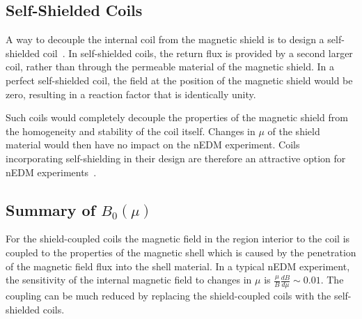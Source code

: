 \documentclass[review]{elsarticle}
\begin{document}

\subsection{Self-Shielded Coils}

A way to decouple the internal coil from the magnetic shield is to design a self-shielded
coil~\cite{bib:cpviolwithoutstrangeness,bib:someotherselfshieldedcoilpapers}.
In self-shielded coils, the return flux is provided by a second larger
coil, rather than through the permeable material of the magnetic
shield.  In a perfect self-shielded coil, the field at the position of
the magnetic shield would be zero, resulting in a reaction factor that
is identically unity.

Such coils would completely decouple the properties of the magnetic
shield from the homogeneity and stability of the coil itself.  Changes
in $\mu$ of the shield material would then have no impact on the nEDM
experiment.  Coils incorporating self-shielding in their design are
therefore an attractive option for nEDM
experiments~\cite{bib:cpviolwithoutstrangeness}.



\subsection{Summary of $B_0(\mu)$}
For the shield-coupled coils the magnetic field in the region interior
to the coil is coupled to the properties of the magnetic shell which is caused
by the penetration of the magnetic field flux into the shell material. In a
typical nEDM experiment, the sensitivity of the internal magnetic
field to changes in $\mu$ is $\frac{\mu}{B}\frac{dB}{d\mu}\sim 0.01$.
The coupling can be much reduced by replacing the shield-coupled coils
with the self-shielded coils.
\end{document}
